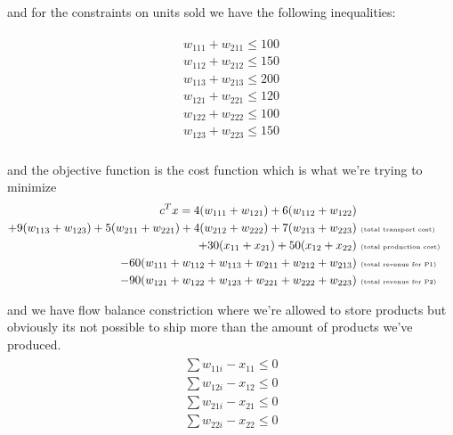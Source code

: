 \documentclass{assignment}
\begin{document}
and for the constraints on units sold we have the following inequalities:

\begin{gather*}
\begin{aligned}
    w_{111} + w_{211} \leq 100 \\
    w_{112} + w_{212} \leq 150 \\
    w_{113} + w_{213} \leq 200 \\
    w_{121} + w_{221} \leq 120 \\
    w_{122} + w_{222} \leq 100 \\
    w_{123} + w_{223} \leq 150 
\end{aligned} \\
\end{gather*}

and the objective function is the cost function which is what we're trying to minimize
\begin{gather*}
\begin{aligned}
    c^Tx = 
    4(w_{111} + w_{121}) + 6(w_{112}+w_{122}) \\
    + 9(w_{113} + w_{123}) + 5(w_{211} + w_{221}) + 4(w_{212} + w_{222}) + 7(w_{213} + w_{223})&\text{ \tiny{(total transport cost)} }\ \\
    + 30(x_{11}+x_{21})+50(x_{12}+x_{22}) &\text{ \tiny{(total production cost)} }\\
    - 60 (w_{111} + w_{112} + w_{113} + w_{211} + w_{212} + w_{213})  &\text{ \tiny{(total revenue for P1)}} \\ 
    - 90 (w_{121} + w_{122} + w_{123} + w_{221} + w_{222} + w_{223}) &\text{ \tiny{(total revenue for P2)}}
\end{aligned} \\
\end{gather*}

and we have flow balance constriction where we're allowed to store products but obviously its not possible to ship more than the amount of products we've produced.
\begin{gather*}
\begin{aligned}
        \sum w_{11i} - x_{11}  \leq 0 \\
        \sum w_{12i} - x_{12} \leq 0\\
        \sum w_{21i} - x_{21} \leq 0 \\ 
        \sum w_{22i} - x_{22} \leq 0
\end{aligned} \\
\end{gather*}
\end{document}
